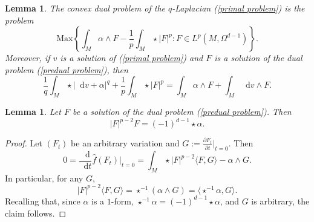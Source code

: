 \documentclass[reqno,11pt]{amsart}
\newcommand*\dif{\mathop{}\!\mathrm{d}}
\newcommand{\Max}{\mathrm{Max}}
\newtheorem{lemma}[theorem]{Lemma}
\theoremstyle{definition}
\numberwithin{equation}{section}
\begin{document}
\begin{lemma}
The convex dual problem of the $q$-Laplacian (\ref{primal problem}) is the problem 
\begin{equation}\label{predual problem}
\Max\left\{\int_M \alpha \wedge F - \frac{1}{p} \int_M \star |F|^p: F \in L^p(M, \Omega^{d - 1})\right\}.
\end{equation}
Moreover, if $v$ is a solution of (\ref{primal problem}) and $F$ is a solution of the dual problem (\ref{predual problem}), then
\begin{equation}\label{extremality relations}
\frac{1}{q} \int_M \star |\dif v + \alpha|^q + \frac{1}{p} \int_M \star |F|^p = \int_M \alpha \wedge F + \int_M \dif v \wedge F.
\end{equation}
\end{lemma}

\begin{lemma}\label{EulerLagrange}
Let $F$ be a solution of the dual problem (\ref{predual problem}). Then
\begin{equation}\label{EL of hat G}
|F|^{p - 2} F = (-1)^{d - 1} \star \alpha.
\end{equation}
\end{lemma}
\begin{proof}
Let $(F_t)$ be an arbitrary variation and $G := \frac{\partial F_t}{\partial t}|_{t = 0}$. Then 
$$0 = \frac{\dif}{\dif t} \hat f(F_t)\bigg|_{t = 0} = \int_M \star |F|^{p - 2} \langle F, G \rangle - \alpha \wedge G.$$
In particular, for any $G$,
$$|F|^{p - 2} \langle F, G\rangle = \star^{-1}(\alpha \wedge G) = \langle \star^{-1} \alpha, G\rangle.$$
Recalling that, since $\alpha$ is a $1$-form, $\star^{-1} \alpha = (-1)^{d - 1} \star \alpha$, and $G$ is arbitrary, the claim follows.
\end{proof}
\end{document}
